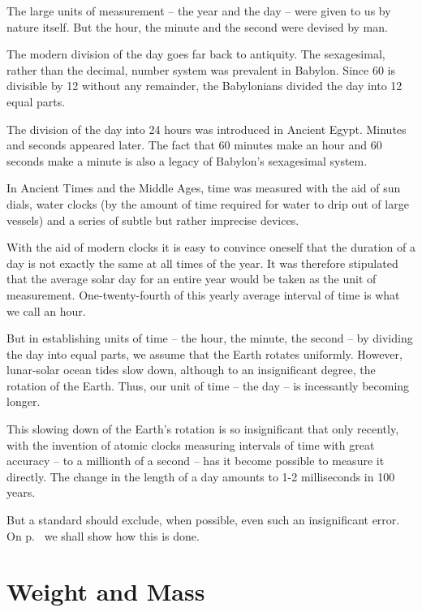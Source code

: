 The large units of measurement -- the year and the day -- were given
to us by nature itself. But the hour, the minute and the second were
devised by man.


The modern division of the day goes far back to antiquity. The
sexagesimal, rather than the decimal, number system was prevalent in
Babylon. Since 60 is divisible by 12 without any remainder, the
Babylonians divided the day into 12 equal parts.

The division of the day into 24 hours was introduced in Ancient
Egypt. Minutes and seconds appeared later. The fact that 60
minutes make an hour and 60 seconds make a minute is also a legacy of
Babylon's sexagesimal system.


In Ancient Times and the Middle Ages, time was measured with the aid
of sun dials, water clocks (by the amount of time required for water
to drip out of large vessels) and a series of subtle but rather
imprecise devices.


With the aid of modern clocks it is easy to convince oneself that the
duration of a day is not exactly the same at all times of the year. It
was therefore stipulated that the average solar day for an entire year
would be taken as the unit of measurement. One-twenty-fourth of this
yearly average interval of time is what we call an hour.

But in establishing units of time -- the hour, the minute, the
second -- by dividing the day into equal parts, we assume that the
Earth rotates uniformly. However, lunar-solar ocean tides slow down,
although to an insignificant degree, the rotation of the
Earth. Thus, our unit of time -- the day -- is incessantly becoming longer.\label{longer-day}

This slowing down of the Earth's rotation is so insignificant that
only recently, with the invention of atomic clocks measuring intervals
of time with great accuracy -- to a millionth of a second -- has it
become possible to measure it directly. The change in the length of a
day amounts to 1-2 milliseconds in 100 years.

But a standard should exclude, when possible, even such an
insignificant error. On p.~\pageref{sec-def} we shall show how this is done.
\section{Weight and Mass}

